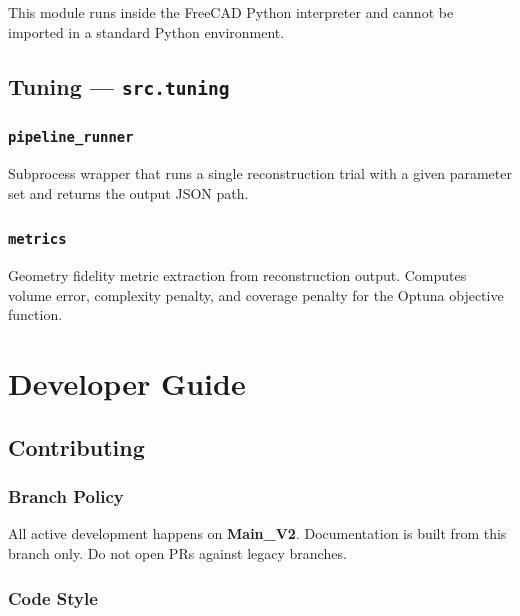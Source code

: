 \documentclass[a4paper, 11pt, openany]{report}
\begin{document}
This module runs inside the FreeCAD Python interpreter and cannot be imported
in a standard Python environment.


\section{Tuning --- \texttt{src.tuning}}
\label{sec:api-tuning}

\subsection{\texttt{pipeline\_runner}}

Subprocess wrapper that runs a single reconstruction trial with a given
parameter set and returns the output JSON path.

\subsection{\texttt{metrics}}

Geometry fidelity metric extraction from reconstruction output.  Computes
volume error, complexity penalty, and coverage penalty for the Optuna
objective function.


\chapter{Developer Guide}
\label{ch:developer}

\section{Contributing}
\label{sec:contributing}

\subsection{Branch Policy}

All active development happens on \textbf{Main\_V2}.  Documentation is built
from this branch only.  Do not open PRs against legacy branches.

\subsection{Code Style}
\end{document}
